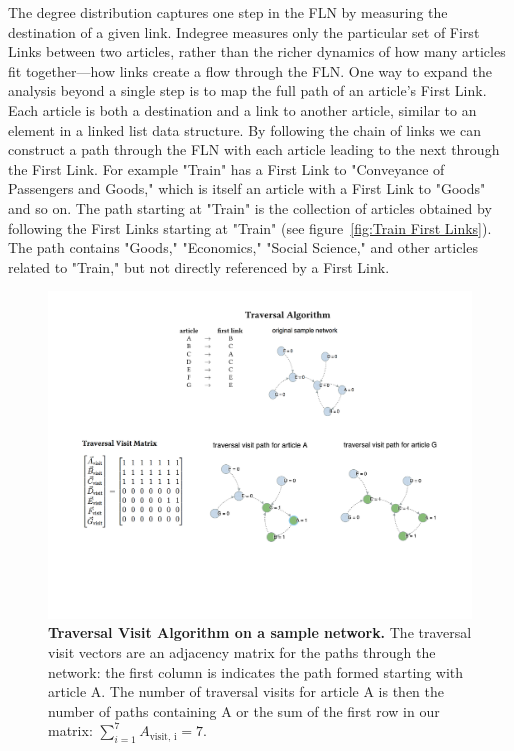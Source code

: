 \documentclass[pre,twocolumn,twoside,superscriptaddress,floatfix, aps, 10pt]{revtex4-1}
\begin{document}
The degree distribution captures one step in the FLN by measuring   
the destination of a given link. 
Indegree measures only the particular set of First Links between two articles, 
rather than the richer dynamics of how many articles fit together---how links 
create a flow through the FLN.
One way to expand the analysis beyond a single step is to map the full path of 
an article's First Link. 
Each article is both a destination and a link to another article, similar to an element 
in a linked list data structure. 
By following the chain of links we can construct a path through the FLN with each article 
leading to the next through the First Link. 
For example "Train" has a First Link to "Conveyance of Passengers and Goods," which is itself
an article with a First Link to "Goods" and so on. The path starting at "Train" 
is the collection of articles obtained by following the First Links starting at "Train"
(see figure~\ref{fig:Train First Links}).
The path contains "Goods," "Economics," "Social Science," and other articles related to 
"Train," but not directly referenced by a First Link. 

\begin{figure}[tp!]
  \centering	
  \includegraphics[width=\textwidth]{graphics/traversal_visit_algo_figure.pdf}  
  \caption{
    \textbf{Traversal Visit Algorithm on a sample network.}
     The traversal visit vectors are an adjacency matrix for the paths through the network: the first column is indicates the path formed starting with article A. The number of traversal visits for article A is then the number of paths containing A or the sum of the first row in our matrix:
     $\sum_{i=1}^7 A_{\text{visit, i}} = 7$.
  }
  \label{fig:Traversal Visits}
\end{figure}
\end{document}
